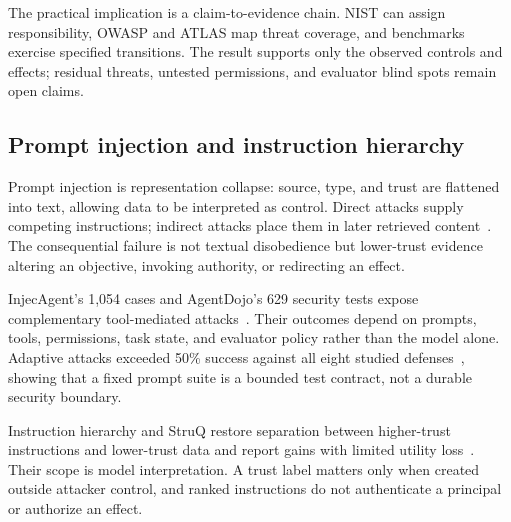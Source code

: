 The practical implication is a claim-to-evidence chain. NIST can assign responsibility, OWASP and ATLAS map threat coverage, and benchmarks exercise specified transitions. The result supports only the observed controls and effects; residual threats, untested permissions, and evaluator blind spots remain open claims.

\subsection{Prompt injection and instruction hierarchy}

Prompt injection is representation collapse: source, type, and trust are flattened into text, allowing data to be interpreted as control. Direct attacks supply competing instructions; indirect attacks place them in later retrieved content~\cite{greshake2023promptinjection}. The consequential failure is not textual disobedience but lower-trust evidence altering an objective, invoking authority, or redirecting an effect.

InjecAgent's 1,054 cases and AgentDojo's 629 security tests expose complementary tool-mediated attacks~\cite{zhan2024injecagent,debenedetti2024agentdojo}. Their outcomes depend on prompts, tools, permissions, task state, and evaluator policy rather than the model alone. Adaptive attacks exceeded 50\% success against all eight studied defenses~\cite{zhan2025adaptiveattacks}, showing that a fixed prompt suite is a bounded test contract, not a durable security boundary.

Instruction hierarchy and StruQ restore separation between higher-trust instructions and lower-trust data and report gains with limited utility loss~\cite{wallace2024instructionhierarchy,chen2025struq}. Their scope is model interpretation. A trust label matters only when created outside attacker control, and ranked instructions do not authenticate a principal or authorize an effect.

